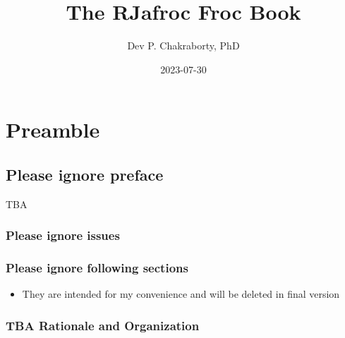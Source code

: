 \documentclass[
]{book}
\title{The RJafroc Froc Book}
\author{Dev P. Chakraborty, PhD}
\date{2023-07-30}
\providecommand{\tightlist}{%
  \setlength{\itemsep}{0pt}\setlength{\parskip}{0pt}}
\begin{document}
\maketitle

{
\setcounter{tocdepth}{1}
\tableofcontents
}
\hypertarget{part-preamble}{%
\part*{Preamble}\label{part-preamble}}

\hypertarget{please-ignore-preface}{%
\chapter{Please ignore preface}\label{please-ignore-preface}}

TBA

\hypertarget{please-ignore-issues}{%
\section{Please ignore issues}\label{please-ignore-issues}}

\hypertarget{please-ignore-following-sections}{%
\section{Please ignore following sections}\label{please-ignore-following-sections}}

\begin{itemize}
\tightlist
\item
  They are intended for my convenience and will be deleted in final version
\end{itemize}

\hypertarget{tba-rationale-and-organization}{%
\section{TBA Rationale and Organization}\label{tba-rationale-and-organization}}
\end{document}
